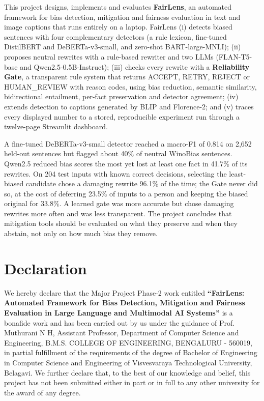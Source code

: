 \documentclass[12pt,a4paper,oneside]{report}
\newcommand{\ProjectTitle}{FairLens: Automated Framework for Bias Detection, Mitigation and Fairness Evaluation in Large Language and Multimodal AI Systems}
\newcommand{\College}{B.M.S. COLLEGE OF ENGINEERING}
\newcommand{\CollegeCity}{BENGALURU - 560019}
\newcommand{\GuideName}{Prof. Muthurani N H}
\newcommand{\GuideDesignation}{Assistant Professor}
\begin{document}
This project designs, implements and evaluates \textbf{FairLens}, an automated framework for bias detection, mitigation
and fairness evaluation in text and image captions that runs entirely on a laptop. FairLens (i) detects biased sentences
with four complementary detectors (a rule lexicon, fine-tuned DistilBERT and DeBERTa-v3-small, and zero-shot
BART-large-MNLI); (ii) proposes neutral rewrites with a rule-based rewriter and two LLMs (FLAN-T5-base and
Qwen2.5-0.5B-Instruct); (iii) checks every rewrite with a \textbf{Reliability Gate}, a transparent rule system that
returns ACCEPT, RETRY, REJECT or HUMAN\_REVIEW with reason codes, using bias reduction, semantic similarity, bidirectional
entailment, per-fact preservation and detector agreement; (iv) extends detection to captions generated by BLIP and
Florence-2; and (v) traces every displayed number to a stored, reproducible experiment run through a twelve-page
Streamlit dashboard.

A fine-tuned DeBERTa-v3-small detector reached a macro-F1 of 0.814 on 2,652 held-out sentences but flagged about 40\% of
neutral WinoBias sentences. Qwen2.5 reduced bias scores the most yet lost at least one fact in 41.7\% of its rewrites.
On 204 test inputs with known correct decisions, selecting the least-biased candidate chose a damaging rewrite 96.1\% of
the time; the Gate never did so, at the cost of deferring 23.5\% of inputs to a person and keeping the biased original
for 33.8\%. A learned gate was more accurate but chose damaging rewrites more often and was less transparent. The project
concludes that mitigation tools should be evaluated on what they preserve and when they abstain, not only on how much
bias they remove.

\chapter*{Declaration}
We hereby declare that the Major Project Phase-2 work entitled \textbf{``\ProjectTitle''} is a bonafide work and has been
carried out by us under the guidance of \GuideName, \GuideDesignation, Department of Computer Science and Engineering,
\College, \CollegeCity, in partial fulfillment of the requirements of the degree of Bachelor of Engineering in Computer
Science and Engineering of Visvesvaraya Technological University, Belagavi. We further declare that, to the best of our
knowledge and belief, this project has not been submitted either in part or in full to any other university for the
award of any degree.
\end{document}
